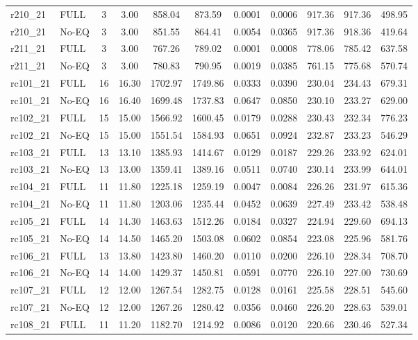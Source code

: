 \begin{longtable}{@{\extracolsep{\fill}}llccccccccc@{}}
\midrule
r210\_21 & FULL & 3 & 3.00 & 858.04 & 873.59 & 0.0001 & 0.0006 & 917.36 & 917.36 & 498.95 \\
r210\_21 & No-EQ & 3 & 3.00 & 851.55 & 864.41 & 0.0054 & 0.0365 & 917.36 & 918.36 & 419.64 \\
\midrule
r211\_21 & FULL & 3 & 3.00 & 767.26 & 789.02 & 0.0001 & 0.0008 & 778.06 & 785.42 & 637.58 \\
r211\_21 & No-EQ & 3 & 3.00 & 780.83 & 790.95 & 0.0019 & 0.0385 & 761.15 & 775.68 & 570.74 \\
\midrule
rc101\_21 & FULL & 16 & 16.30 & 1702.97 & 1749.86 & 0.0333 & 0.0390 & 230.04 & 234.43 & 679.31 \\
rc101\_21 & No-EQ & 16 & 16.40 & 1699.48 & 1737.83 & 0.0647 & 0.0850 & 230.10 & 233.27 & 629.00 \\
\midrule
rc102\_21 & FULL & 15 & 15.00 & 1566.92 & 1600.45 & 0.0179 & 0.0288 & 230.43 & 232.34 & 776.23 \\
rc102\_21 & No-EQ & 15 & 15.00 & 1551.54 & 1584.93 & 0.0651 & 0.0924 & 232.87 & 233.23 & 546.29 \\
\midrule
rc103\_21 & FULL & 13 & 13.10 & 1385.93 & 1414.67 & 0.0129 & 0.0187 & 229.26 & 233.92 & 624.01 \\
rc103\_21 & No-EQ & 13 & 13.00 & 1359.41 & 1389.16 & 0.0511 & 0.0740 & 230.14 & 233.99 & 644.01 \\
\midrule
rc104\_21 & FULL & 11 & 11.80 & 1225.18 & 1259.19 & 0.0047 & 0.0084 & 226.26 & 231.97 & 615.36 \\
rc104\_21 & No-EQ & 11 & 11.80 & 1203.06 & 1235.44 & 0.0452 & 0.0639 & 227.49 & 233.42 & 538.48 \\
\midrule
rc105\_21 & FULL & 14 & 14.30 & 1463.63 & 1512.26 & 0.0184 & 0.0327 & 224.94 & 229.60 & 694.13 \\
rc105\_21 & No-EQ & 14 & 14.50 & 1465.20 & 1503.08 & 0.0602 & 0.0854 & 223.08 & 225.96 & 581.76 \\
\midrule
rc106\_21 & FULL & 13 & 13.80 & 1423.80 & 1460.20 & 0.0110 & 0.0200 & 226.10 & 228.34 & 708.70 \\
rc106\_21 & No-EQ & 14 & 14.00 & 1429.37 & 1450.81 & 0.0591 & 0.0770 & 226.10 & 227.00 & 730.69 \\
\midrule
rc107\_21 & FULL & 12 & 12.00 & 1267.54 & 1282.75 & 0.0128 & 0.0161 & 225.58 & 228.51 & 545.60 \\
rc107\_21 & No-EQ & 12 & 12.00 & 1267.26 & 1280.42 & 0.0356 & 0.0460 & 226.20 & 228.63 & 539.01 \\
\midrule
rc108\_21 & FULL & 11 & 11.20 & 1182.70 & 1214.92 & 0.0086 & 0.0120 & 220.66 & 230.46 & 527.34 \\

\end{longtable}
